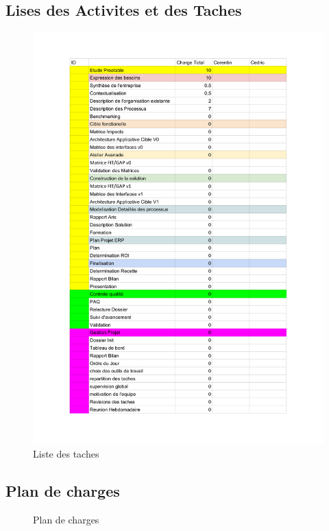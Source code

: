 \documentclass[]{scrartcl}
\begin{document}
\subsection{Lises des Activites et des Taches}
\begin{center}
\begin{figure}[H]
\includegraphics[width=1.15\textwidth]{img/Taches_v0}
\caption{Liste des taches}
\end{figure}
\end{center}
\subsection{Plan de charges}
\begin{center}
\begin{figure}[H]
\caption{Plan de charges}
\end{figure}
\end{center}
\end{document}
